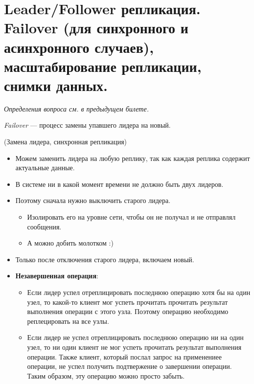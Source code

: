 \section{Leader/Follower репликация. Failover (для синхронного и асинхронного случаев), масштабирование репликации, снимки данных.}

\textit{Определения вопроса см. в предыдущем билете.}

\begin{definition}
    \textit{Failover} --- процесс замены упавшего лидера на новый.
\end{definition}

\begin{algorithm}(Замена лидера, синхронная репликация)
    \begin{itemize}
        \item Можем заменить лидера на любую реплику, так как каждая реплика содержит актуальные данные.
        \item В системе ни в какой момент времени не должно быть двух лидеров.

        \item Поэтому сначала нужно выключить старого лидера.
        \begin{itemize}
            \item Изолировать его на уровне сети, чтобы он не получал и не отправлял сообщения.
            \item А можно добить молотком :)
        \end{itemize}

        \item Только после отключения старого лидера, включаем новый.

        \item \textbf{Незавершенная операция}:
        \begin{itemize}
            \item Если лидер успел отреплицировать последнюю операцию хотя бы на один узел, то какой-то клиент мог успеть прочитать прочитать результат выполнения операции с этого узла. Поэтому операцию необходимо реплецировать на все узлы.
            \item Если лидер не успел отреплицировать последнюю операцию ни на один узел, то ни один клиент не мог успеть прочитать результат выполнения операции. Также клиент, который послал запрос на применениее операции, не успел получить подтвержение о завершении операции. Таким образом, эту операцию можно просто забыть.
        \end{itemize}

    \end{itemize}

\end{algorithm}

